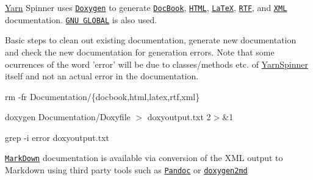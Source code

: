 \hyperlink{a00026}{Yarn} Spinner uses \href{https://www.stack.nl/~dimitri/doxygen}{\tt Doxygen} to generate \href{http://docbook.org/}{\tt Doc\-Book}, \href{https://en.wikipedia.org/wiki/HTML}{\tt H\-T\-M\-L}, \href{https://www.latex-project.org/help/documentation/}{\tt La\-Te\-X}, \href{https://en.wikipedia.org/wiki/Rich_Text_Format}{\tt R\-T\-F}, and \href{https://en.wikipedia.org/wiki/XML}{\tt X\-M\-L} documentation. \href{https://www.gnu.org/software/global/}{\tt G\-N\-U G\-L\-O\-B\-A\-L} is also used.

Basic steps to clean out existing documentation, generate new documentation and check the new documentation for generation errors. Note that some ocurrences of the word 'error' will be due to classes/methods etc. of \hyperlink{a00157}{Yarn\-Spinner} itself and not an actual error in the documentation.


\begin{DoxyItemize}
\item rm -\/fr Documentation/\{docbook,html,latex,rtf,xml\}
\item doxygen Documentation/\-Doxyfile $>$ doxyoutput.\-txt 2$>$\&1
\item grep -\/i error doxyoutput.\-txt
\end{DoxyItemize}

\href{https://daringfireball.net/projects/markdown/}{\tt Mark\-Down} documentation is available via conversion of the X\-M\-L output to Markdown using third party tools such as \href{http://pandoc.org}{\tt Pandoc} or \href{https://github.com/pferdinand/doxygen2md}{\tt doxygen2md} 